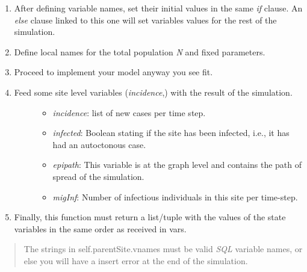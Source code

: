 \documentclass[a4paper,10pt]{manual}
\begin{document}
\begin{enumerate}
\begin{description}
\begin{enumerate}
\item {} 
After defining variable names, set their initial values in the same \emph{if} clause. An \emph{else} clause linked to this one will set variables values for the rest of the simulation.

\item {} 
Define local names for the total population \emph{N} and fixed parameters.

\item {} 
Proceed to implement your model anyway you see fit.

\item {} \begin{description}
\item[Feed some site level variables (\emph{incidence},) with the result of the simulation.]\begin{itemize}
\item {} 
\emph{incidence}: list of new cases per time step.

\item {} 
\emph{infected}: Boolean stating if the site has been infected, i.e., it has had an autoctonous case.

\item {} 
\emph{epipath}: This variable is at the graph level and contains the path of spread of the simulation.

\item {} 
\emph{migInf}: Number of infectious individuals in this site per time-step.

\end{itemize}

\end{description}

\item {} 
Finally, this function must return a list/tuple with the values of the state variables in the same order as received in vars.

\end{enumerate}

\end{description}

\end{enumerate}
\begin{quote}

\begin{notice}[warning]
The strings in self.parentSite.vnames must be valid \emph{SQL} variable names, or else you will have a insert error at the end of the simulation.
\end{notice}
\end{quote}
\end{document}
